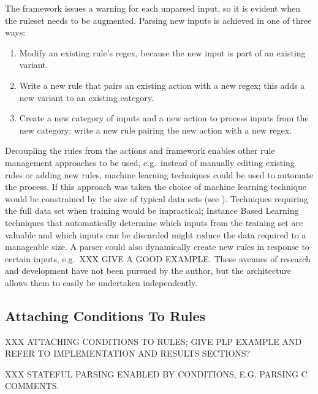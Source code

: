 The framework issues a warning for each unparsed input, so it is evident
when the ruleset needs to be augmented.  Parsing new inputs is achieved in
one of three ways:

\begin{enumerate}

    \item Modify an existing rule's regex, because the new input is part of
        an existing variant.

    \item Write a new rule that pairs an existing action with a new regex;
        this adds a new variant to an existing category.

    \item Create a new category of inputs and a new action to process
        inputs from the new category; write a new rule pairing the new
        action with a new regex.

\end{enumerate}

Decoupling the rules from the actions and framework enables other rule
management approaches to be used, e.g.\ instead of manually editing
existing rules or adding new rules, machine learning techniques could be
used to automate the process.  If this approach was taken the choice of
machine learning technique would be constrained by the size of typical data
sets (see ).  Techniques requiring the full
data set when training would be impractical; Instance Based
Learning~\cite{instance-based-learning} techniques that automatically
determine which inputs from the training set are valuable and which inputs
can be discarded might reduce the data required to a manageable size.  A
parser could also dynamically create new rules in response to certain
inputs, e.g.\ XXX GIVE A GOOD EXAMPLE\@.  These avenues of research and
development have not been pursued by the author, but the architecture
allows them to easily be undertaken independently.

\subsection{Attaching Conditions To Rules}

\label{attaching conditions to rules}

XXX ATTACHING CONDITIONS TO RULES\@; GIVE PLP EXAMPLE AND REFER TO
IMPLEMENTATION AND RESULTS SECTIONS\@?

XXX STATEFUL PARSING ENABLED BY CONDITIONS, E.G\@.  PARSING C COMMENTS\@.

